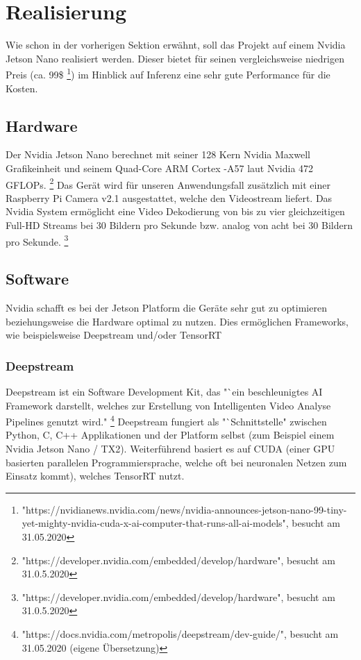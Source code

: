 \documentclass[a4paper,oneside,12pt]{report}
\begin{document}
	\chapter{Realisierung}
	\begin{onehalfspace}
		Wie schon in der vorherigen Sektion erwähnt, soll das Projekt auf einem Nvidia Jetson Nano realisiert werden. Dieser bietet für seinen vergleichsweise niedrigen Preis (ca. 99\$
		\footnote{"https://nvidianews.nvidia.com/news/nvidia-announces-jetson-nano-99-tiny-yet-mighty-nvidia-cuda-x-ai-computer-that-runs-all-ai-models", besucht am 31.05.2020})
		im Hinblick auf Inferenz eine sehr gute Performance für die Kosten.
		\section{Hardware}
		Der Nvidia Jetson Nano berechnet mit seiner 128 Kern Nvidia Maxwell Grafikeinheit und seinem Quad-Core ARM Cortex -A57 laut Nvidia 472 GFLOPs.
		\footnote{"https://developer.nvidia.com/embedded/develop/hardware", besucht am 31.0.5.2020}
		Das Gerät wird für unseren Anwendungsfall zusätzlich mit einer Raspberry Pi Camera v2.1 ausgestattet, welche den Videostream liefert. Das Nvidia System ermöglicht eine Video Dekodierung von bis zu vier gleichzeitigen Full-HD Streams bei 30 Bildern pro Sekunde bzw. analog von acht bei 30 Bildern pro Sekunde.
		\footnote{"https://developer.nvidia.com/embedded/develop/hardware", besucht am 31.0.5.2020}
		\section{Software}
		Nvidia schafft es bei der Jetson Platform die Geräte sehr gut zu optimieren beziehungsweise die Hardware optimal zu nutzen. Dies ermöglichen Frameworks, wie beispielsweise Deepstream und/oder TensorRT
		\subsection{Deepstream}
		Deepstream ist ein Software Development Kit, das "`ein beschleunigtes AI Framework darstellt, welches zur Erstellung von Intelligenten Video Analyse Pipelines genutzt wird."
		\footnote{"https://docs.nvidia.com/metropolis/deepstream/dev-guide/", besucht am 31.05.2020 (eigene Übersetzung)}
		Deepstream fungiert als "`Schnittstelle" zwischen Python, C, C++ Applikationen und der Platform selbst (zum Beispiel einem Nvidia Jetson Nano / TX2).
		Weiterführend basiert es auf CUDA (einer GPU basierten parallelen Programmiersprache, welche oft bei neuronalen Netzen zum Einsatz kommt), welches TensorRT nutzt.

\end{onehalfspace}
\end{document}
